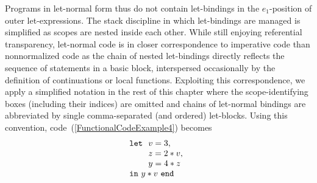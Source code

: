 Programs in let-normal form thus do not contain let-bindings in the
$e_1$-position of outer let-expressions. The stack discipline in which
let-bindings are managed is simplified as scopes are nested inside
each other.
While still enjoying referential transparency, let-normal code is in
closer correspondence to imperative code than nonnormalized code as
the chain of nested let-bindings directly reflects the sequence of
statements in a basic block, interspersed occasionally by the
definition of continuations or local functions. Exploiting this
correspondence, we apply a simplified notation in the rest of this
chapter where the scope-identifying boxes (including their indices)
are omitted and chains of let-normal bindings are abbreviated by
single comma-separated (and ordered) let-blocks. Using this
convention, code~(\ref{FunctionalCodeExample4}) becomes
\begin{equation}
\label{FunctionalCodeExample5}
\begin{array}{l}
\texttt{let}\, \begin{array}[t]{l}
                 v = 3,\\
                 z=2*v, \\
                 y = 4*z
             \end{array}\\ 
\texttt{in}\ y*v\ \texttt{end}
\end{array}
\end{equation}




